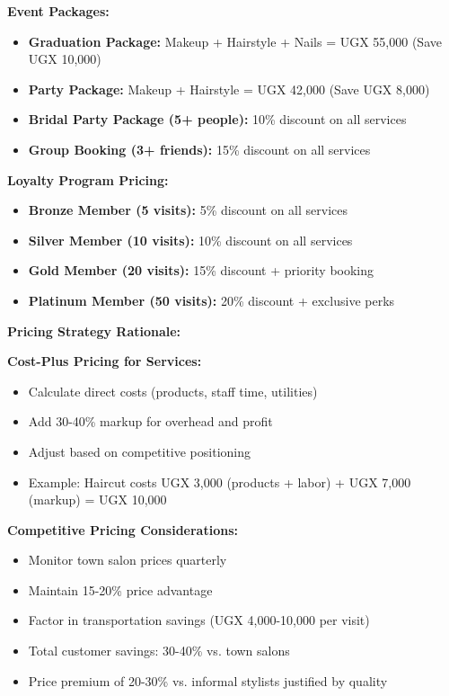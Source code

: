 \documentclass[a4paper,12pt]{article}
\begin{document}
\textbf{Event Packages:}
\begin{itemize}[leftmargin=2em]
    \item \textbf{Graduation Package:} Makeup + Hairstyle + Nails = UGX 55,000 (Save UGX 10,000)
    \item \textbf{Party Package:} Makeup + Hairstyle = UGX 42,000 (Save UGX 8,000)
    \item \textbf{Bridal Party Package (5+ people):} 10\% discount on all services
    \item \textbf{Group Booking (3+ friends):} 15\% discount on all services
\end{itemize}

\textbf{Loyalty Program Pricing:}
\begin{itemize}[leftmargin=2em]
    \item \textbf{Bronze Member (5 visits):} 5\% discount on all services
    \item \textbf{Silver Member (10 visits):} 10\% discount on all services
    \item \textbf{Gold Member (20 visits):} 15\% discount + priority booking
    \item \textbf{Platinum Member (50 visits):} 20\% discount + exclusive perks
\end{itemize}

\vspace{1em}

\textbf{Pricing Strategy Rationale:}

\textbf{Cost-Plus Pricing for Services:}
\begin{itemize}[leftmargin=2em]
    \item Calculate direct costs (products, staff time, utilities)
    \item Add 30-40\% markup for overhead and profit
    \item Adjust based on competitive positioning
    \item Example: Haircut costs UGX 3,000 (products + labor) + UGX 7,000 (markup) = UGX 10,000
\end{itemize}

\textbf{Competitive Pricing Considerations:}
\begin{itemize}[leftmargin=2em]
    \item Monitor town salon prices quarterly
    \item Maintain 15-20\% price advantage
    \item Factor in transportation savings (UGX 4,000-10,000 per visit)
    \item Total customer savings: 30-40\% vs. town salons
    \item Price premium of 20-30\% vs. informal stylists justified by quality
\end{itemize}
\end{document}
